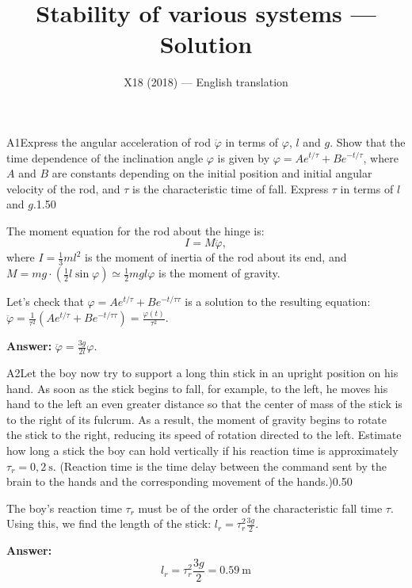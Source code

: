 \documentclass[11pt,a4paper]{article}
\title{\textbf{Stability of various systems --- Solution}}
\author{\normalsize X18 (2018) — English translation}
\date{}
\begin{document}
\maketitle\vspace{-0.5em}
\begin{solcard}{A1}{Express the angular acceleration of rod $\ddot{\varphi}$ in terms of $\varphi$, $l$ and $g$. Show that the time dependence of the inclination angle $\varphi$ is given by $\varphi=Ae^{t/\tau}+Be^{-t/\tau}$, where $A$ and $B$ are constants depending on the initial position and initial angular velocity of the rod, and $\tau$ is the characteristic time of fall. Express $\tau$ in terms of $l$ and $g$.}{1.50}

The moment equation for the rod about the hinge is: \[ I = M \ddot{\varphi},\]where $I=\frac{1}{3} ml^2$ is the moment of inertia of the rod about its end, and $M=mg \cdot \left(\frac{1}{2} l \sin \varphi \right) \simeq \frac{1}{2} mgl \varphi$ is the moment of gravity.


Let's check that $\varphi =Ae^{t/\tau}+Be^{-t/τ\tau}$ is a solution to the resulting equation: $\ddot{\varphi} = \frac{1}{\tau^2} \left(Ae^{t/\tau}+Be^{-t/τ\tau} \right) =  \frac{\varphi (t)}{\tau^2}$.

\par\smallskip\noindent\textbf{Answer:} $\ddot{\varphi}=\frac{3g}{2l} \varphi$.
\end{solcard}

\begin{solcard}{A2}{Let the boy now try to support a long thin stick in an upright position on his hand. As soon as the stick begins to fall, for example, to the left, he moves his hand to the left an even greater distance so that the center of mass of the stick is to the right of its fulcrum. As a result, the moment of gravity begins to rotate the stick to the right, reducing its speed of rotation directed to the left. Estimate how long a stick the boy can hold vertically if his reaction time is approximately $\tau_r=0{,}2~\text{s}$. (Reaction time is the time delay between the command sent by the brain to the hands and the corresponding movement of the hands.)}{0.50}

The boy's reaction time $\tau_r$ must be of the order of the characteristic fall time $\tau$. Using this, we find the length of the stick: $l_r=\tau_r^2  \frac{3g}{2}$.

\par\smallskip\noindent\textbf{Answer:} \[l_r=\tau_r^2  \frac{3g}{2}=0.59~\text{m}\]
\end{solcard}
\end{document}
